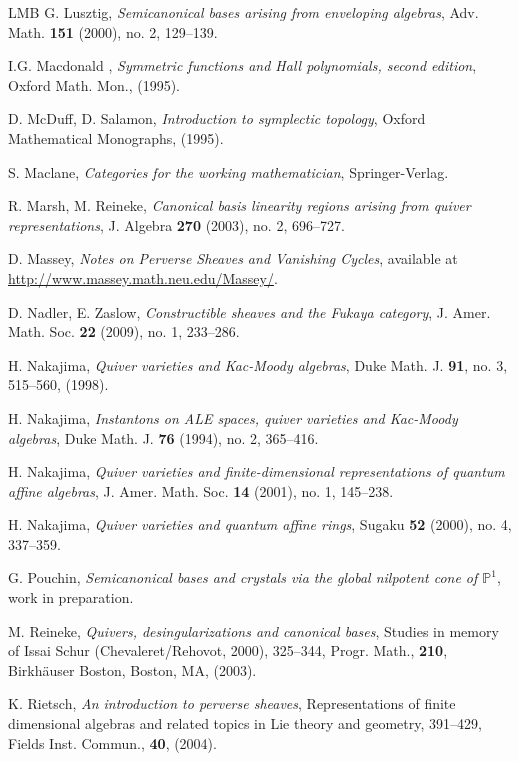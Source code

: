 \documentclass[a4paper,10pt]{amsart}
\numberwithin{equation}{section}
\begin{document}
{\begin{thebibliography}{LMB}
G. Lusztig, \emph{Semicanonical bases arising from enveloping algebras},  Adv. Math. \textbf{151} (2000), no. 2,
129--139.

I.G. Macdonald , \emph{Symmetric functions and Hall polynomials, second edition}, Oxford Math. Mon., (1995).

D. McDuff, D. Salamon, \emph{Introduction to symplectic topology},
Oxford Mathematical Monographs, (1995).

S. Maclane, \emph{Categories for the working mathematician}, Springer-Verlag.

R. Marsh, M. Reineke, \emph{Canonical basis linearity regions arising from quiver representations},  J. Algebra  \textbf{270}  (2003),  no. 2, 696--727.

  D. Massey, \emph{Notes on Perverse Sheaves and Vanishing Cycles}, available at \url{http://www.massey.math.neu.edu/Massey/}.

D. Nadler, E. Zaslow, \emph{Constructible sheaves and the Fukaya category},  J. Amer. Math. Soc. \textbf{22}  (2009),  no. 1, 233--286.

H. Nakajima, \emph{Quiver varieties and Kac-Moody algebras}, Duke Math. J. \textbf{91}, no. 3, 515--560, (1998). 

H. Nakajima, \emph{Instantons on ALE spaces, quiver varieties and Kac-Moody algebras},  Duke Math. J. \textbf{76} (1994), no. 2, 365--416.

H. Nakajima, \emph{Quiver varieties and finite-dimensional representations of quantum affine algebras}, J. Amer. Math. Soc. \textbf{14} (2001), no. 1, 145--238.

H. Nakajima, \emph{Quiver varieties and quantum affine rings}, Sugaku \textbf{52} (2000), no. 4, 337--359. 

G. Pouchin, \emph{Semicanonical bases and crystals via the global nilpotent cone of $\mathbb{P}^1$}, work in preparation.

M. Reineke, \emph{Quivers, desingularizations and canonical bases},  Studies in memory of Issai Schur (Chevaleret/Rehovot, 2000),  325--344, Progr. Math., \textbf{210}, Birkh\"auser Boston, Boston, MA, (2003). 

K. Rietsch, \emph{An introduction to perverse sheaves},  Representations of finite dimensional algebras and related topics in Lie theory and geometry,  391--429, Fields Inst. Commun., \textbf{40}, (2004).


\end{thebibliography}}
\end{document}
